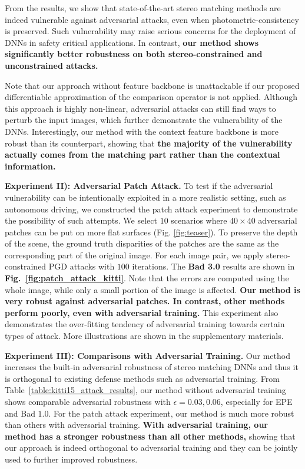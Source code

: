 \documentclass[10pt,twocolumn,letterpaper]{article}
\begin{document}
From the results, we show that state-of-the-art stereo matching methods are indeed vulnerable against adversarial attacks, even when photometric-consistency is preserved. Such vulnerability may raise serious concerns for the deployment of DNNs in safety critical applications. In contrast, \textbf{our method shows significantly better robustness on both stereo-constrained and unconstrained attacks.} 


Note that our approach without feature backbone is unattackable if our proposed differentiable approximation of the comparison operator is not applied. Although this approach is highly non-linear, adversarial attacks can still find ways to perturb the input images, which further demonstrate the vulnerability of the DNNs. Interestingly, our method with the context feature backbone is more robust than its counterpart, showing that \textbf{the majority of the vulnerability actually comes from the matching part rather than the contextual information.} 
 
\textbf{Experiment II):  Adversarial Patch Attack.} To test if the adversarial vulnerability can be intentionally exploited in a more realistic setting, such as autonomous driving, we constructed the patch attack experiment to demonstrate the possibility of such attempts. We select $10$ scenarios where $40\times{40}$ adversarial patches can be put on more flat surfaces (\eg Fig. \ref{fig:teaser}). To preserve the depth of the scene, the ground truth disparities of the patches are the same as the corresponding part of the original image. For each image pair, we apply stereo-constrained PGD attacks with $100$ iterations. The \textbf{Bad 3.0} results are shown in \textbf{Fig.~\ref{fig:patch_attack_kitti}}. Note that the errors are computed using the whole image, while only a small portion of the image is affected. \textbf{Our method is very robust against adversarial patches. In contrast, other methods perform poorly, even with adversarial training.} This experiment also demonstrates the over-fitting tendency of adversarial training towards certain types of attack. More illustrations are shown in the supplementary materials.


\textbf{Experiment III): Comparisons with Adversarial Training.}
Our method increases the built-in adversarial robustness of stereo matching DNNs and thus it is orthogonal to existing defense methods such as adversarial training. From Table~\ref{table:kitti15_attack_results}, our method without adversarial training shows comparable adversarial robustness with $\epsilon=0.03,0.06$, especially for EPE and Bad $1.0$. For the patch attack experiment, our method is much more robust than others with adversarial training. \textbf{With adversarial training, our method has a stronger robustness than all other methods,} showing that our approach is indeed orthogonal to adversarial training and they can be jointly used to further improved robustness.
\end{document}
